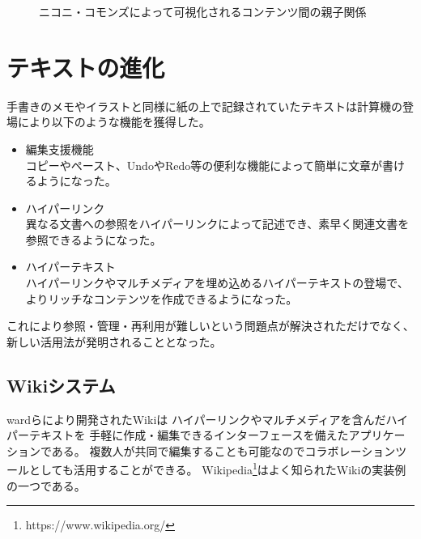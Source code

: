 \begin{figure}[htbp]
    \begin{center}
         \end{center}
    \caption{ニコニ・コモンズによって可視化されるコンテンツ間の親子関係}
\end{figure}


\section{テキストの進化}
手書きのメモやイラストと同様に紙の上で記録されていたテキストは計算機の登場により以下のような機能を獲得した。
\begin{itemize}
    \item 編集支援機能\\
    コピーやペースト、UndoやRedo等の便利な機能によって簡単に文章が書けるようになった。
    \item ハイパーリンク\\
    異なる文書への参照をハイパーリンクによって記述でき、素早く関連文書を参照できるようになった。
    \item ハイパーテキスト\\
    ハイパーリンクやマルチメディアを埋め込めるハイパーテキストの登場で、よりリッチなコンテンツを作成できるようになった。
\end{itemize}
これにより参照・管理・再利用が難しいという問題点が解決されただけでなく、新しい活用法が発明されることとなった。

\subsection{Wikiシステム}

wardらにより開発されたWiki\cite{Leuf2001TheWW}は ハイパーリンクやマルチメディアを含んだハイパーテキストを
手軽に作成・編集できるインターフェースを備えたアプリケーションである。
複数人が共同で編集することも可能なのでコラボレーションツールとしても活用することができる。
Wikipedia\footnote{https://www.wikipedia.org/}はよく知られたWikiの実装例の一つである。

